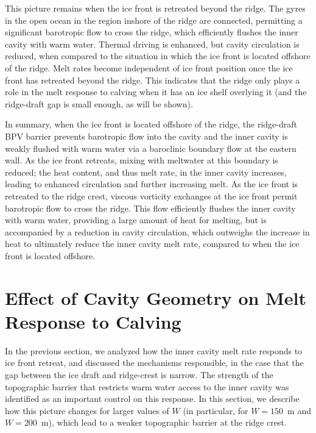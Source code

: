 \documentclass[draft]{agujournal2019}
\begin{document}
This picture remains when the ice front is retreated beyond the ridge. The gyres in the open ocean in the region inshore of the ridge are connected, permitting a significant barotropic flow to cross the ridge, which efficiently flushes the inner cavity with warm water. Thermal driving is enhanced, but cavity circulation is reduced, when compared to the situation in which the ice front is located offshore of the ridge. Melt rates become independent of ice front position once the ice front has retreated beyond the ridge. This indicates that the ridge only plays a role in the melt response to calving when it has an ice shelf overlying it (and the ridge-draft gap is small enough, as will be shown).

In summary, when the ice front is located offshore of the ridge, the ridge-draft BPV barrier prevents barotropic flow into the cavity and the inner cavity is weakly flushed with warm water via a baroclinic boundary flow at the eastern wall. As the ice front retreats, mixing with meltwater at this boundary is reduced; the heat content, and thus melt rate, in the inner cavity increases, leading to enhanced circulation and further increasing melt. As the ice front is retreated to the ridge crest, viscous vorticity exchanges at the ice front permit barotropic flow to cross the ridge. This flow efficiently flushes the inner cavity with warm water, providing a large amount of heat for melting, but is accompanied by a reduction in cavity circulation, which outweighs the increase in heat to ultimately reduce the inner cavity melt rate, compared to when the ice front is located offshore.


\section{Effect of Cavity Geometry on Melt Response to Calving}\label{S:Results:H}
In the previous section, we analyzed how the inner cavity melt rate responds to ice front retreat, and discussed the mechanisms responsible, in the case that the gap between the ice draft and ridge-crest is narrow. The strength of the topographic barrier that restricts warm water access to the inner cavity was identified as an important control on this response. In this section, we describe how this picture changes for larger values of $W$ (in particular, for $W=150$~m and $W=200$~m), which lead to a weaker topographic barrier at the ridge crest.

\end{document}
